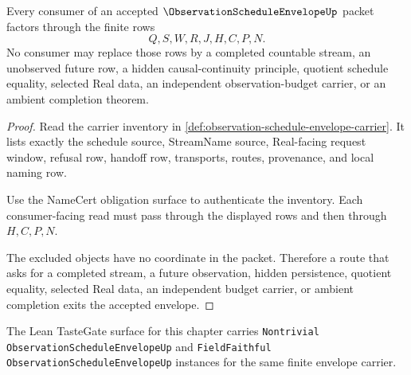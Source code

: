\begin{theorem}
\label{thm:observation-schedule-envelope-nonescape}
Every consumer of an accepted $\ObservationScheduleEnvelopeUp$ packet factors through the finite rows
$$
Q,S,W,R,J,H,C,P,N.
$$
No consumer may replace those rows by a completed countable stream, an unobserved future row, a hidden causal-continuity principle, quotient schedule equality, selected Real data, an independent observation-budget carrier, or an ambient completion theorem.
\end{theorem}
\begin{proof}
Read the carrier inventory in \autoref{def:observation-schedule-envelope-carrier}. It lists exactly the schedule source, StreamName source, Real-facing request window, refusal row, handoff row, transports, routes, provenance, and local naming row.

Use the NameCert obligation surface to authenticate the inventory. Each consumer-facing read must pass through the displayed rows and then through $H,C,P,N$.

The excluded objects have no coordinate in the packet. Therefore a route that asks for a completed stream, a future observation, hidden persistence, quotient equality, selected Real data, an independent budget carrier, or ambient completion exits the accepted envelope.
\end{proof}

The Lean TasteGate surface for this chapter carries \texttt{Nontrivial ObservationScheduleEnvelopeUp} and \texttt{FieldFaithful ObservationScheduleEnvelopeUp} instances for the same finite envelope carrier.

\begin{closurestatus}{\ObservationScheduleEnvelopeUp}
  \theoryclosure{\seedClosure}
  \formalstatus{\unformalizedV}
\end{closurestatus}
